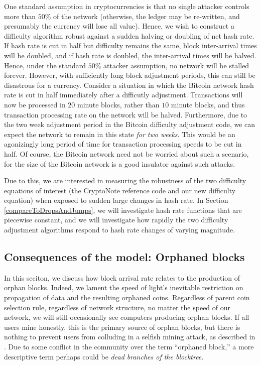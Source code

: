 \documentclass[12pt,english]{mrl}
\theoremstyle{definition}
\numberwithin{equation}{section}
\numberwithin{figure}{section}
\numberwithin{equation}{section}
\numberwithin{equation}{section}
\numberwithin{figure}{section}
\begin{document}
One standard assumption in cryptocurrencies is that no single attacker controls more than $50\%$ of the network (otherwise, the ledger may be re-written, and presumably the currency will lose all value). Hence, we wish to construct a difficulty algorithm robust against a sudden halving or doubling of net hash rate.  If hash rate is cut in half but difficulty remains the same, block inter-arrival times will be doubled, and if hash rate is doubled, the inter-arrival times will be halved. Hence, under the standard $50\%$ attacker assumption, no network will be stalled forever. However, with sufficiently long block adjustment periods, this can still be disastrous for a currency. Consider a situation in which the Bitcoin network hash rate is cut in half immediately after a difficutly adjustment. Transactions will now be processed in $20$ minute blocks, rather than $10$ minute blocks, and thus transaction processing rate on the network will be halved. Furthermore, due to the two week adjustment period in the Bitcoin difficulty adjustment code, we can expect the network to remain in this state \emph{for two weeks}. This would be an agonizingly long period of time for transaction processing speeds to be cut in half. Of course, the Bitcoin network need not be worried about such a scenario, for the size of the Bitcoin network is a good insulator against such attacks.

Due to this, we are interested in measuring the robustness of the two difficulty equations of interest (the CryptoNote reference code and our new difficulty equation) when exposed to sudden large changes in hash rate. In Section \ref{compareToDropsAndJumps}, we will investigate hash rate functions that are piecewise constant, and we will investigate how rapidly the two difficulty adjustment algorithms respond to hash rate changes of varying magnitude.

\subsection{Consequences of the model: Orphaned blocks}\label{orphanedBlocks}
In this seciton,  we discuss how block arrival rate relates to the production of orphan blocks. Indeed, we lament the speed of light's inevitable restriction on propagation of data and the resulting orphaned coins.  Regardless of parent coin selection rule, regardless of network structure, no matter the speed of our network, we will still occasionally see computers producing orphan blocks. If all users mine honestly, this is the primary source of orphan blocks, but there is nothing to prevent users from colluding in a selfish mining attack, as described in \cite{eyal2014majority}. Due to some conflict in the community over the term ``orphaned block,'' a more descriptive term perhaps could be \textit{dead branches of the  blocktree}.
\end{document}
